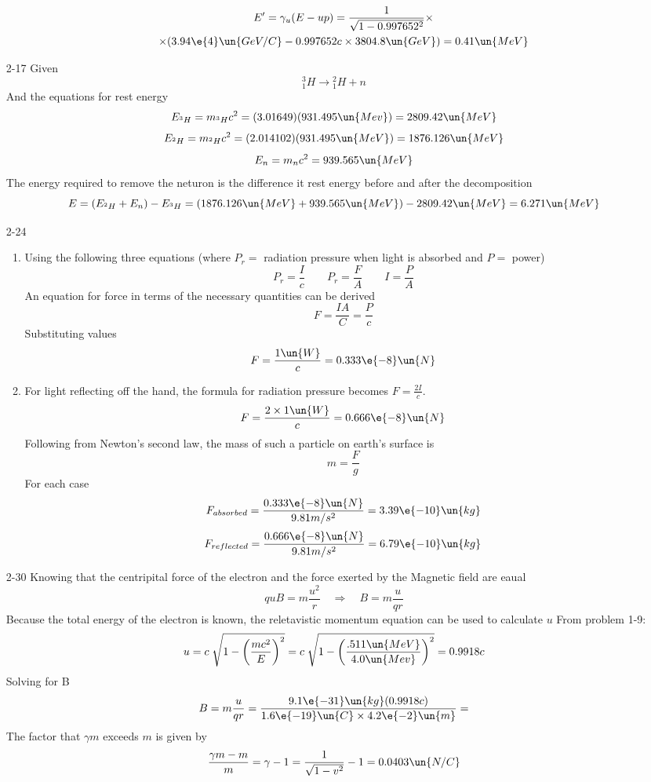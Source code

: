 \documentclass{2620hw}
\begin{document}
\begin{enumerate}
\begin{enumerate}
		\begin{multline}
			E' = \gamma_u (E - up) =  \frac{1}{\sqrt{ 1 - 0.997652^2}}\times\\\times ( 3.94\e{4}\un{GeV/C} - 0.997652c \times 3804.8\un{GeV}) =  0.41\un{MeV}		
		\end{multline}

	\end{enumerate}

	\item [2-17] Given 
	\[
		{}^3_1H \rightarrow {}^2_1H	+ n
	\]
	And the equations for rest energy
	\[
		E_{{}^3H} = m_{{}^3H}c^2 = (3.01649)(931.495\un{Mev}) = 2809.42 \un{MeV}
	\]
	\[
		E_{{}^2H} = m_{{}^2H}c^2 = (2.014102)(931.495\un{MeV}) = 1876.126 \un{MeV}	
	\]
	\[
		E_{n} = m_{n}c^2 = 939.565\un{MeV}
	\]
	The energy required to remove the neturon is the difference it rest energy before and after the decomposition
	\[
		E = (E_{{}^2H} + E_n) -  E_{{}^3H} = (1876.126 \un{MeV} + 939.565\un{MeV}) - 2809.42 \un{MeV} = 6.271\un{MeV}
	\]

	\item [2-24] 
	\begin{enumerate}
	
	\item Using the following three equations (where $P_r = $ radiation pressure when light is absorbed and $P = $ power)
	\[
		P_r = \frac{I}{c} \quad\quad P_r = \frac{F}{A} \quad\quad I = \frac{P}{A} 
	\]
	An equation for force in terms of the necessary quantities can be derived 
	\[
		F = \frac{IA}{C} =  \frac{P}{c} 
	\]
	Substituting values
	\[
		F = \frac{1 \un{W}}{c} = 0.333\e{-8}\un{N} 
	\]

	\item For light reflecting off the hand, the formula for radiation pressure becomes $F = \frac{2I}{c}$.
	\[
		F = \frac{2\times 1 \un{W}}{c} = 0.666\e{-8}\un{N}
	\]
	Following from Newton's second law, the mass of such a particle on earth's surface is
	\[
		m = \frac{F}{g}  
	\]
	For each case
	\[
		F_{absorbed} = \frac{0.333\e{-8}\un{N}}{9.81 m/s^2}  =  3.39\e{-10}\un{kg}
	\]
	\[
		F_{reflected} = \frac{0.666\e{-8}\un{N}}{9.81 m/s^2} =  6.79\e{-10}\un{kg}
	\]
	\end{enumerate}

	\item [2-30] Knowing that the centripital force of the electron and the force exerted by the Magnetic field are eaual
	\[
		quB = m\frac{u^2}{r} \quad \Rightarrow \quad B = m\frac{u}{qr} 
	\]
	Because the total energy of the electron is known, the reletavistic momentum equation can be used to calculate $u$
	From problem 1-9:
	\[
			u = c \; \sqrt{ 1 - \left( \frac{mc^2}{E}  \right)^2} = c \; \sqrt{ 1 - \left( \frac{.511\un{MeV}}{4.0\un{Mev}}  \right)^2} = 0.9918c
	\]
	Solving for B
	\[
		B = m\frac{u}{qr} = \frac{9.1\e{-31}\un{kg}(0.9918c)}{1.6\e{-19}\un{C}\times4.2\e{-2}\un{m}} = 
	\]
	The factor that $\gamma m$ exceeds $m$ is given by
	\[
		\frac{\gamma m - m}{m} = \gamma - 1 = \frac{1}{\sqrt{ 1 - v^2}} - 1 = 0.0403 \un{N/C}
	\]


\end{enumerate}
\end{document}
